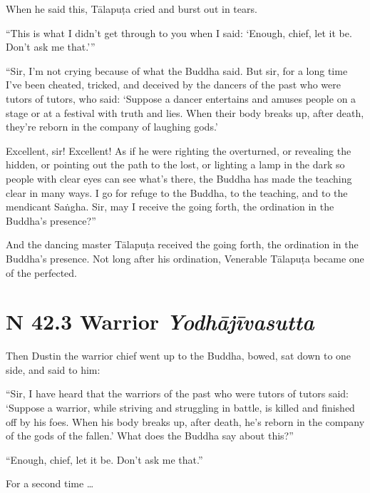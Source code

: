 \documentclass[12pt,openany]{book}%
\newcommand*{\suttatitleacronym}[1]{\smaller[2]{#1}\vspace*{.3em}}
\newcommand*{\suttatitletranslation}[1]{\linebreak{#1}}
\newcommand*{\suttatitleroot}[1]{\linebreak\smaller[2]\itshape{#1}}
\newcommand*{\tocacronym}[1]{\hspace*{-3.3em}{#1}\quad}
\newcommand*{\toctranslation}[1]{#1}
\newcommand*{\tocroot}[1]{(\textit{#1})}
\begin{document}
When he said this, \textsanskrit{Tālapuṭa} cried and burst out in tears. 

“This is what I didn’t get through to you when I said: ‘Enough, chief, let it be. Don’t ask me that.’” 

“Sir, I’m not crying because of what the Buddha said. But sir, for a long time I’ve been cheated, tricked, and deceived by the dancers of the past who were tutors of tutors, who said: ‘Suppose a dancer entertains and amuses people on a stage or at a festival with truth and lies. When their body breaks up, after death, they’re reborn in the company of laughing gods.’ 

Excellent, sir! Excellent! As if he were righting the overturned, or revealing the hidden, or pointing out the path to the lost, or lighting a lamp in the dark so people with clear eyes can see what’s there, the Buddha has made the teaching clear in many ways. I go for refuge to the Buddha, to the teaching, and to the mendicant \textsanskrit{Saṅgha}. Sir, may I receive the going forth, the ordination in the Buddha’s presence?” 

And the dancing master \textsanskrit{Tālapuṭa} received the going forth, the ordination in the Buddha’s presence. Not long after his ordination, Venerable \textsanskrit{Tālapuṭa} became one of the perfected. 

%
\section*{{\suttatitleacronym SN 42.3}{\suttatitletranslation A Warrior }{\suttatitleroot Yodhājīvasutta}}
\addcontentsline{toc}{section}{\tocacronym{SN 42.3} \toctranslation{A Warrior } \tocroot{Yodhājīvasutta}}

Then Dustin the warrior chief went up to the Buddha, bowed, sat down to one side, and said to him: 

“Sir, I have heard that the warriors of the past who were tutors of tutors said: ‘Suppose a warrior, while striving and struggling in battle, is killed and finished off by his foes. When his body breaks up, after death, he’s reborn in the company of the gods of the fallen.’ What does the Buddha say about this?” 

“Enough, chief, let it be. Don’t ask me that.” 

For a second time … 
\end{document}
